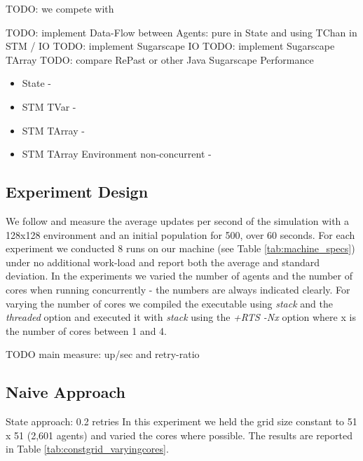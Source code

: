 TODO: we compete with \cite{lysenko_framework_2008}

TODO: implement Data-Flow between Agents: pure in State and using TChan in STM / IO
TODO: implement Sugarscape IO
TODO: implement Sugarscape TArray
TODO: compare RePast or other Java Sugarscape Performance

\begin{itemize}
	\item State - 
	\item STM TVar -
	\item STM TArray -
	\item STM TArray Environment non-concurrent -
\end{itemize}

\subsection{Experiment Design}
We follow \cite{lysenko_framework_2008} and measure the average updates per second of the simulation with a 128x128 environment and an initial population for 500, over 60 seconds. For each experiment we conducted 8 runs on our machine (see Table \ref{tab:machine_specs}) under no additional work-load and report both the average and standard deviation. In the experiments we varied the number of agents and the number of cores when running concurrently - the numbers are always indicated clearly. For varying the number of cores we compiled the executable using \textit{stack} and the \textit{threaded} option and executed it with \textit{stack} using the \textit{+RTS -Nx} option where x is the number of cores between 1 and 4. 

TODO main measure: up/sec and retry-ratio

\subsection{Naive Approach}

State approach: 0.2 retries
In this experiment we held the grid size constant to 51 x 51 (2,601 agents) and varied the cores where possible. The results are reported in Table \ref{tab:constgrid_varyingcores}.

